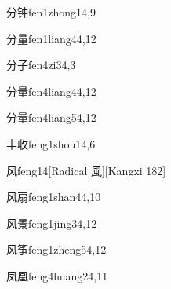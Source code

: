 \begin{verbete}{分钟}{fen1zhong1}{4,9}
\end{verbete}

\begin{verbete}{分量}{fen1liang4}{4,12}
\end{verbete}

\begin{verbete}{分子}{fen4zi3}{4,3}
\end{verbete}

\begin{verbete}{分量}{fen4liang4}{4,12}
\end{verbete}

\begin{verbete}{分量}{fen4liang5}{4,12}
\end{verbete}

\begin{verbete}{丰收}{feng1shou1}{4,6}
\end{verbete}

\begin{verbete}{风}{feng1}{4}[Radical 風][Kangxi 182]
\end{verbete}

\begin{verbete}{风扇}{feng1shan4}{4,10}
\end{verbete}

\begin{verbete}{风景}{feng1jing3}{4,12}
\end{verbete}

\begin{verbete}{风筝}{feng1zheng5}{4,12}
\end{verbete}

\begin{verbete}{凤凰}{feng4huang2}{4,11}
\end{verbete}

